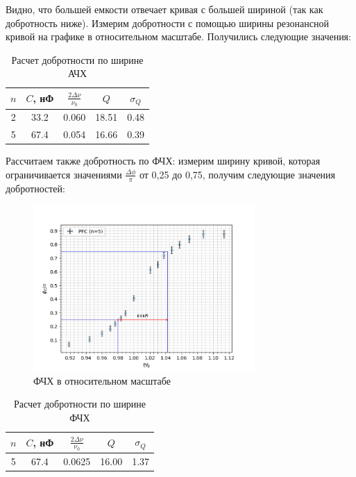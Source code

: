 \documentclass[a4paper, 12pt]{article}
\begin{document}
Видно, что большей емкости отвечает кривая с большей шириной (так как добротность ниже). Измерим добротности с помощью ширины резонансной кривой на графике в относительном масштабе. Получились следующие значения:

\begin{table}[h]
    \centering
    \begin{tabular}{|c|c|c|c|c|}
        \hline
        $n$ & $C$, нФ & $\frac{2\Delta \nu}{\nu_0}$ & $Q$ & $\sigma_Q$ \\ \hline
        2 & 33.2 & 0.060 & 18.51 & 0.48 \\ \hline
        5 & 67.4 & 0.054 & 16.66 & 0.39 \\ \hline
    \end{tabular}
    \caption{Расчет добротности по ширине АЧХ}
\end{table}

Рассчитаем также добротность по ФЧХ: измерим ширину кривой, которая ограничивается значениями $\frac{\Delta \phi}{\pi}$ от 0,25 до 0,75, получим следующие значения добротностей:

\begin{figure}[H]
    \centering
    \includegraphics[width = 0.75\textwidth, height = 0.40\textheight]{PFC/graphs/combined_marked.pdf}
    \caption{ФЧХ в относительном масштабе}
\end{figure}

\begin{table}[H]
    \centering
    \begin{tabular}{|c|c|c|c|c|}
        \hline
        $n$ & $C$, нФ & $\frac{2\Delta \nu}{\nu_0}$ & $Q$ & $\sigma_Q$ \\ \hline
        5 & 67.4 & 0.0625 & 16.00 & 1.37  \\ \hline
    \end{tabular}
    \caption{Расчет добротности по ширине ФЧХ}
\end{table}
\end{document}
